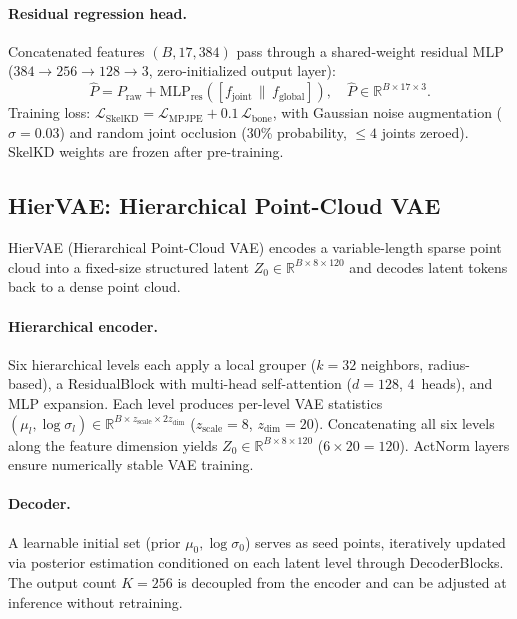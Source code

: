 \documentclass{article}
\newcommand{\Rbb}{\mathbb{R}}
\begin{document}
\paragraph{Residual regression head.}
Concatenated features $(B,17,384)$ pass through a shared-weight residual MLP
($384\!\to\!256\!\to\!128\!\to\!3$, zero-initialized output layer):
\begin{equation}
  \hat{P} = P_\text{raw}
            + \mathrm{MLP}_\text{res}\!\left([f_\text{joint}\,\|\,f_\text{global}]\right),
  \quad \hat{P}\!\in\!\Rbb^{B\times17\times3}.
\end{equation}
Training loss:
$\mathcal{L}_\text{SkelKD} = \mathcal{L}_\text{MPJPE} + 0.1\,\mathcal{L}_\text{bone}$,
with Gaussian noise augmentation ($\sigma\!=\!0.03$) and random joint occlusion
(30\% probability, $\leq\!4$ joints zeroed).
SkelKD weights are frozen after pre-training.

\subsection{HierVAE: Hierarchical Point-Cloud VAE}
\label{sec:compressor}

HierVAE (Hierarchical Point-Cloud VAE) encodes a variable-length sparse point
cloud into a fixed-size structured latent $Z_0\!\in\!\Rbb^{B\times8\times120}$
and decodes latent tokens back to a dense point cloud.

\paragraph{Hierarchical encoder.}
Six hierarchical levels each apply a local grouper ($k\!=\!32$ neighbors,
radius-based), a ResidualBlock with multi-head self-attention
($d\!=\!128$, 4~heads), and MLP expansion.
Each level produces per-level VAE statistics
$(\mu_l,\log\sigma_l)\!\in\!\Rbb^{B\times z_\text{scale}\times2z_\text{dim}}$
($z_\text{scale}\!=\!8$, $z_\text{dim}\!=\!20$).
Concatenating all six levels along the feature dimension yields
$Z_0\!\in\!\Rbb^{B\times8\times120}$ ($6\!\times\!20\!=\!120$).
ActNorm layers ensure numerically stable VAE training.

\paragraph{Decoder.}
A learnable initial set (prior $\mu_0, \log\sigma_0$) serves as seed points,
iteratively updated via posterior estimation conditioned on each latent level
through DecoderBlocks.
The output count $K\!=\!256$ is decoupled from the encoder and can be adjusted
at inference without retraining.
\end{document}
